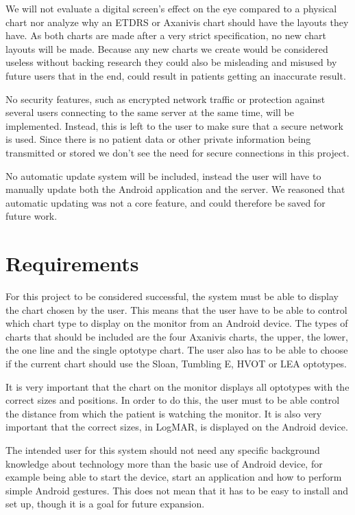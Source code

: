 \documentclass[12pt,a4paper,notitlepage]{report}
\begin{document}
We will not evaluate a digital screen's effect on the eye compared to a physical chart nor analyze why an ETDRS or Axanivis chart should have the layouts they have. As both charts are made after a very strict specification, no new chart layouts will be made. Because any new charts we create would be considered useless without backing research they could also be misleading and misused by future users that in the end, could result in patients getting an inaccurate result.

No security features, such as encrypted network traffic or protection against several users connecting to the same server at the same time, will be implemented. Instead, this is left to the user to make sure that a secure network is used. Since there is no patient data or other private information being transmitted or stored we don't see the need for secure connections in this project.

No automatic update system will be included, instead the user will have to manually update both the Android application and the server. We reasoned that automatic updating was not a core feature, and could therefore be saved for future work.

\section{Requirements}
For this project to be considered successful, the system must be able to display the chart chosen by the user. This means that the user have to be able to control which chart type to display on the monitor from an Android device. The types of charts that should be included are the four Axanivis charts, the upper, the lower, the one line and the single optotype chart. The user also has to be able to choose if the current chart should use the Sloan, Tumbling E, HVOT or LEA optotypes.

It is very important that the chart on the monitor displays all optotypes with the correct sizes and positions. In order to do this, the user must to be able control the distance from which the patient is watching the monitor. It is also very important that the correct sizes, in LogMAR, is displayed on the Android device.

The intended user for this system should not need any specific background knowledge about technology more than the basic use of Android device, for example being able to start the device, start an application and how to perform simple Android gestures. This does not mean that it has to be easy to install and set up, though it is a goal for future expansion. 
\end{document}
